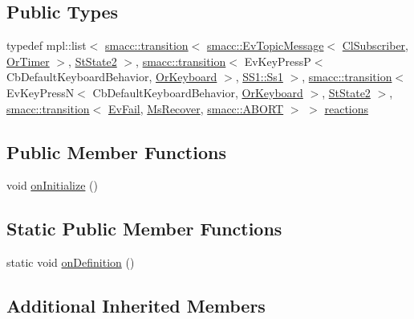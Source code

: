 \subsection*{Public Types}
\begin{DoxyCompactItemize}
\item 
typedef mpl\+::list$<$ \hyperlink{classsmacc_1_1transition}{smacc\+::transition}$<$ \hyperlink{structsmacc_1_1EvTopicMessage}{smacc\+::\+Ev\+Topic\+Message}$<$ \hyperlink{classsm__three__some_1_1cl__subscriber_1_1ClSubscriber}{Cl\+Subscriber}, \hyperlink{classsm__three__some_1_1OrTimer}{Or\+Timer} $>$, \hyperlink{structsm__three__some_1_1StState2}{St\+State2} $>$, \hyperlink{classsmacc_1_1transition}{smacc\+::transition}$<$ Ev\+Key\+PressP$<$ Cb\+Default\+Keyboard\+Behavior, \hyperlink{classsm__three__some_1_1OrKeyboard}{Or\+Keyboard} $>$, \hyperlink{structsm__three__some_1_1SS1_1_1Ss1}{S\+S1\+::\+Ss1} $>$, \hyperlink{classsmacc_1_1transition}{smacc\+::transition}$<$ Ev\+Key\+PressN$<$ Cb\+Default\+Keyboard\+Behavior, \hyperlink{classsm__three__some_1_1OrKeyboard}{Or\+Keyboard} $>$, \hyperlink{structsm__three__some_1_1StState2}{St\+State2} $>$, \hyperlink{classsmacc_1_1transition}{smacc\+::transition}$<$ \hyperlink{structsm__three__some_1_1EvFail}{Ev\+Fail}, \hyperlink{classsm__three__some_1_1MsRecover}{Ms\+Recover}, \hyperlink{structsmacc_1_1ABORT}{smacc\+::\+A\+B\+O\+RT} $>$ $>$ \hyperlink{structsm__three__some_1_1StState1_a45853dd4f500ceab60b7981b975048c5}{reactions}
\end{DoxyCompactItemize}
\subsection*{Public Member Functions}
\begin{DoxyCompactItemize}
\item 
void \hyperlink{structsm__three__some_1_1StState1_ac57412e5c59fa38f9a58be3b56b62762}{on\+Initialize} ()
\end{DoxyCompactItemize}
\subsection*{Static Public Member Functions}
\begin{DoxyCompactItemize}
\item 
static void \hyperlink{structsm__three__some_1_1StState1_a69bbe0bcf47acd2ea803972785c23589}{on\+Definition} ()
\end{DoxyCompactItemize}
\subsection*{Additional Inherited Members}


